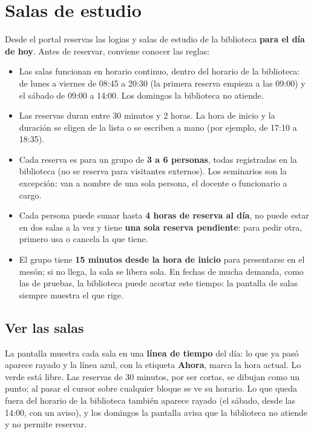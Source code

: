 \documentclass[11pt,a4paper]{report}
\begin{document}
\chapter{Salas de estudio}

Desde el portal reservas las logias y salas de estudio de la biblioteca
\textbf{para el día de hoy}. Antes de reservar, conviene conocer las
reglas:

\begin{itemize}
  \item Las salas funcionan en horario continuo, dentro del horario de la
  biblioteca: de lunes a viernes de 08:45 a 20:30 (la primera reserva
  empieza a las 09:00) y el sábado de 09:00 a 14:00. Los domingos la
  biblioteca no atiende.
  \item Las reservas duran entre 30 minutos y 2 horas. La hora de inicio y la
  duración se eligen de la lista o se escriben a mano (por ejemplo, de 17:10
  a 18:35).
  \item Cada reserva es para un grupo de \textbf{3 a 6 personas}, todas
  registradas en la biblioteca (no se reserva para visitantes externos). Los
  seminarios son la excepción: van a nombre de una sola persona, el docente
  o funcionario a cargo.
  \item Cada persona puede sumar hasta \textbf{4 horas de reserva al día},
  no puede estar en dos salas a la vez y tiene \textbf{una sola reserva
  pendiente}: para pedir otra, primero usa o cancela la que tiene.
  \item El grupo tiene \textbf{15 minutos desde la hora de inicio} para
  presentarse en el mesón; si no llega, la sala se libera sola. En fechas de
  mucha demanda, como las de pruebas, la biblioteca puede acortar este tiempo:
  la pantalla de salas siempre muestra el que rige.
\end{itemize}

\section{Ver las salas}

La pantalla muestra cada sala en una \textbf{línea de tiempo} del día: lo
que ya pasó aparece rayado y la línea azul, con la etiqueta \textbf{Ahora},
marca la hora actual. Lo verde está libre. Las reservas de 30 minutos, por
ser cortas, se dibujan como un punto; al pasar el cursor sobre cualquier
bloque se ve su horario. Lo que queda fuera del horario de la biblioteca
también aparece rayado (el sábado, desde las 14:00, con un aviso), y los
domingos la pantalla avisa que la biblioteca no atiende y no permite
reservar.
\end{document}
